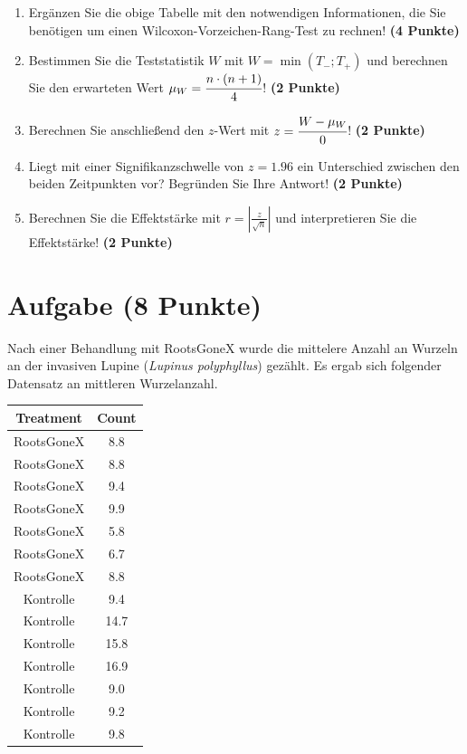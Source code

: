 \documentclass[a4paper, 10pt]{scrartcl}\usepackage[]{graphicx}\usepackage[]{xcolor}
\newenvironment{knitrout}{}{} %
\begin{document}
\begin{enumerate}
\item Erg{\"a}nzen Sie die obige Tabelle mit den notwendigen Informationen, die
  Sie ben{\"o}tigen um einen Wilcoxon-Vorzeichen-Rang-Test zu rechnen!
  \textbf{(4 Punkte)}
\item Bestimmen Sie die Teststatistik $W$ mit $W = \min(T_{-}; T_{+})$ und
  berechnen Sie den erwarteten Wert $\mu_W = \cfrac{n \cdot (n + 1)}{4}$!
  \textbf{(2 Punkte)}
\item Berechnen Sie anschlie{\ss}end den $z$-Wert mit $z = \cfrac{W -
    \mu_W}{0}$! \textbf{(2 Punkte)}
\item Liegt mit einer Signifikanzschwelle von $z =
  1.96$ ein Unterschied zwischen den beiden Zeitpunkten vor? Begr{\"u}nden Sie
  Ihre Antwort! \textbf{(2 Punkte)} 
\item Berechnen Sie die Effektst{\"a}rke mit $r = |\frac{z}{\sqrt{n}}| $ und
  interpretieren Sie die Effektst{\"a}rke! \textbf{(2 Punkte)} 
\end{enumerate} 
\clearpage

\section{Aufgabe \hfill (8 Punkte)}



Nach einer Behandlung mit RootsGoneX wurde die mittelere Anzahl an Wurzeln
an der invasiven Lupine (\textit{Lupinus polyphyllus}) gez{\"a}hlt. Es ergab sich
folgender Datensatz an mittleren Wurzelanzahl.

\begin{knitrout}
\color{fgcolor}\begin{table}[!h]
\centering
\begin{tabular}{cc}
\toprule
Treatment & Count\\
\midrule
RootsGoneX & 8.8\\
RootsGoneX & 8.8\\
RootsGoneX & 9.4\\
RootsGoneX & 9.9\\
RootsGoneX & 5.8\\
\addlinespace
RootsGoneX & 6.7\\
RootsGoneX & 8.8\\
Kontrolle & 9.4\\
Kontrolle & 14.7\\
Kontrolle & 15.8\\
\addlinespace
Kontrolle & 16.9\\
Kontrolle & 9.0\\
Kontrolle & 9.2\\
Kontrolle & 9.8\\
\bottomrule
\end{tabular}
\end{table}

\end{knitrout}
\end{document}
